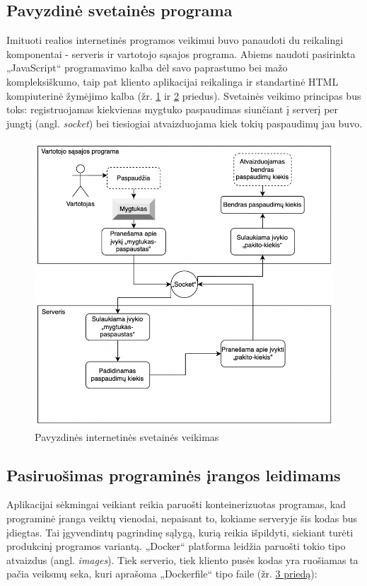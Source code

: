 \documentclass{VUMIFPSkursinis}
\begin{document}
\subsection{Pavyzdinė svetainės programa}

Imituoti realios internetinės programos veikimui buvo panaudoti du reikalingi komponentai - serveris ir vartotojo sąsajos programa. Abiems naudoti pasirinkta „JavaScript“ programavimo kalba dėl savo paprastumo bei mažo kompleksiškumo, taip pat kliento aplikacijai reikalinga ir standartinė HTML  kompiuterinė žymėjimo kalba (žr. \hyperref[priedas1]{1} ir \hyperref[priedas2]{2} priedus). Svetainės veikimo principas bus toks: registruojamas kiekvienas mygtuko paspaudimas siunčiant į serverį per jungtį (angl. \textit{socket}) bei tiesiogiai atvaizduojama kiek tokių paspaudimų jau buvo.

\begin{figure}[H]
    \centering
    \includegraphics[scale=0.8]{img/Aplikacija.png}
    \caption{Pavyzdinės internetinės svetainės veikimas}
    \label{img:mlp}
\end{figure}

\subsection{Pasiruošimas programinės įrangos leidimams}

Aplikacijai sėkmingai veikiant reikia paruošti konteinerizuotas programas, kad programinė įranga veiktų vienodai, nepaisant to, kokiame serveryje šis kodas bus įdiegtas. Tai įgyvendintų pagrindinę sąlygą, kurią reikia išpildyti, siekiant turėti produkcinį programos variantą. „Docker“ platforma leidžia paruošti tokio tipo atvaizdus (angl. \textit{images}). Tiek serverio, tiek kliento pusės kodas yra ruošiamas ta pačia veiksmų seka, kuri aprašoma „Dockerfile“ tipo faile (žr. \hyperref[priedas3]{3 priedą}):
\end{document}
